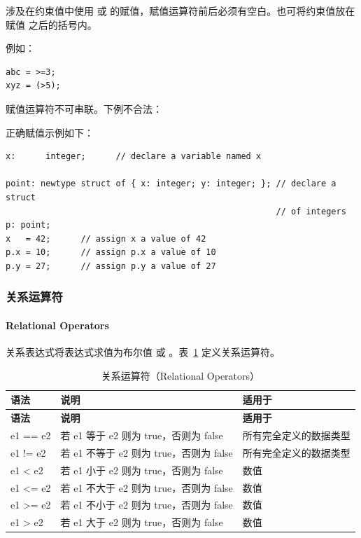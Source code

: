 涉及在约束值中使用 \cmd{>} 或 \cmd{>=} 的赋值，赋值运算符前后必须有空白。也可将约束值放在赋值 \cmd{=} 之后的括号内。

例如：
\begin{lstlisting}[style=pxl]
abc = >=3;
xyz = (>5);
\end{lstlisting}

\begin{noteBox}
赋值运算符不可串联。下例不合法：\\
\end{noteBox}

正确赋值示例如下：
\begin{lstlisting}[style=pxl]
x:      integer;      // declare a variable named x

point: newtype struct of { x: integer; y: integer; }; // declare a struct
                                                      // of integers
p: point;
x   = 42;      // assign x a value of 42
p.x = 10;      // assign p.x a value of 10
p.y = 27;      // assign p.y a value of 27
\end{lstlisting}

\subsubsection{关系运算符}
\paragraph*{Relational Operators}

关系表达式将表达式求值为布尔值  或 。表~\ref{tab:pxl-rel-ops} 定义关系运算符。

\begin{longtable}{@{}>{\raggedright\arraybackslash\ttfamily}p{} p{} p{}@{}}
\caption{关系运算符（Relational Operators）}\label{tab:pxl-rel-ops}\\
\toprule
\textbf{\textrm{语法}} & \textbf{\textrm{说明}} & \textbf{\textrm{适用于}} \\
\midrule
\endfirsthead
\toprule
\textbf{\textrm{语法}} & \textbf{\textrm{说明}} & \textbf{\textrm{适用于}} \\
\midrule
\endhead
\bottomrule
\endfoot
e1 == e2 & 若 e1 等于 e2 则为 true，否则为 false & 所有完全定义的数据类型 \\
e1 != e2 & 若 e1 不等于 e2 则为 true，否则为 false & 所有完全定义的数据类型 \\
e1 < e2 & 若 e1 小于 e2 则为 true，否则为 false & 数值 \\
e1 <= e2 & 若 e1 不大于 e2 则为 true，否则为 false & 数值 \\
e1 >= e2 & 若 e1 不小于 e2 则为 true，否则为 false & 数值 \\
e1 > e2 & 若 e1 大于 e2 则为 true，否则为 false & 数值 \\
\end{longtable}

